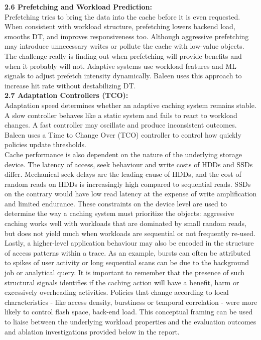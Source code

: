 \documentclass[sigconf]{acmart}
\begin{document}
{\noindent\textbf{2.6 Prefetching and Workload Prediction:}\\Prefetching tries to bring the data into the cache before it is even requested. When consistent with workload structure, prefetching lowers backend load, smooths DT, and improves responsiveness too. Although aggressive prefetching may introduce unnecessary writes or pollute the cache with low-value objects. The challenge really is finding out when prefetching will provide benefits and when it probably will not. Adaptive systems use workload features and ML signals to adjust prefetch intensity dynamically. Baleen uses this approach to increase hit rate without destabilizing DT.\\

\noindent\textbf{2.7 Adaptation Controllers (TCO):}\\Adaptation speed determines whether an adaptive caching system remains stable. A slow controller behaves like a static system and fails to react to workload changes. A fast controller may oscillate and produce inconsistent outcomes. Baleen uses a Time to Change Over (TCO) controller to control how quickly policies update thresholds.\\

\noindent Cache performance is also dependent on the nature of the underlying storage device. The latency of access, seek behaviour and write costs of HDDs and SSDs differ. Mechanical seek delays are the leading cause of HDDs, and the cost of random reads on HDDs is increasingly high compared to sequential reads. SSDs on the contrary would have low read latency at the expense of write amplification and limited endurance. These constraints on the device level are used to determine the way a caching system must prioritize the objects: aggressive caching works well with workloads that are dominated by small random reads, but does not yield much when workloads are sequential or not frequently re-used.\\

\noindent Lastly, a higher-level application behaviour may also be encoded in the structure of access patterns within a trace. As an example, bursts can often be attributed to spikes of user activity or long sequential scans can be due to the background job or analytical query. It is important to remember that the presence of such structural signals identifies if the caching action will have a benefit, harm or excessively overheading activities. Policies that change according to local characteristics - like access density, burstiness or temporal correlation - were more likely to control flash space, back-end load. This conceptual framing can be used to liaise between the underlying workload properties and the evaluation outcomes and ablation investigations provided below in the report.

}
\end{document}
